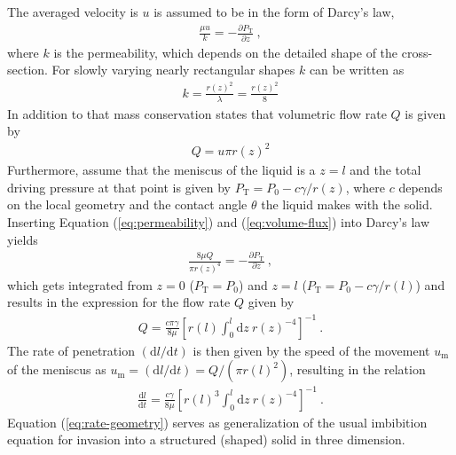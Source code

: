 \documentclass[aip, amsmath, amssymb, reprint, twocolumn, floatfix]{revtex4-1}
\newcommand{\dldt}{\frac{\mathrm{d}l}{\mathrm{d}t}}
\newcommand{\Pt}{P_\mathrm{T}}
\newcommand{\dz}{\mathrm{d}z}
\begin{document}
The averaged velocity is $u$ is assumed to be in the form of Darcy's law,
\begin{gather}
	\frac{\mu u}{k} = -\frac{\partial \Pt}{\partial z}~,
	\label{eq:darcy-law}
\end{gather}
where $k$ is the permeability, which depends on the detailed shape of the cross-section. For slowly varying nearly rectangular shapes $k$ can be written as
\begin{gather}
	k = \frac{r(z)^2}{\lambda} = \frac{r(z)^2}{8}
	\label{eq:permeability}
\end{gather}
In addition to that mass conservation states that volumetric flow rate $Q$ is given by
\begin{gather}
	Q = u \pi r(z)^2  
	\label{eq:volume-flux}
\end{gather}
Furthermore, assume that the meniscus of the liquid is a $z = l$ and the total driving pressure at that point is given by $\Pt = P_0 - c \gamma/r(z)$, where $c$ depends on the local geometry and the contact angle $\theta$ the liquid makes with the solid. Inserting Equation (\ref{eq:permeability}) and (\ref{eq:volume-flux}) into Darcy's law yields
\begin{gather}
	\frac{8 \mu Q}{\pi r(z)^4} = -\frac{\partial \Pt}{\partial z}~,
	\label{eq:darcy-law-flux}
\end{gather}
which gets integrated from $z=0$ ($\Pt = P_0$) and $z = l$ ($\Pt = P_0  - c \gamma/r(l)$) and results in the expression for the flow rate $Q$ given by
\begin{gather}
	Q = \frac{c \pi \gamma}{8\mu} \left[ r(l) \int_0^{l}\!\!\!\dz~r(z)^{-4} \right]^{-1}~.
	\label{eq:volume-flux-integral}
\end{gather}
The rate of penetration $\left(\mathrm{d}l/\mathrm{d}t\right)$ is then given by the speed of the movement $u_\mathrm{m}$ of the meniscus as $u_\mathrm{m} = \left(\mathrm{d}l/\mathrm{d}t\right) = Q / (\pi r(l)^2)$, resulting in the relation
\begin{gather}
	\boxed{\dldt = \frac{c \gamma}{8\mu} \left[ r(l)^3 \int_0^{l}\!\!\!\dz~r(z)^{-4} \right]^{-1}}~.
	\label{eq:rate-geometry}
\end{gather}
Equation (\ref{eq:rate-geometry}) serves as generalization of the usual imbibition equation for invasion into a structured (shaped) solid in three dimension.
\bigskip
\end{document}
